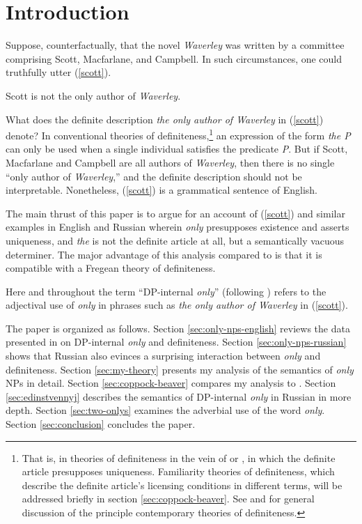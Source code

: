 \section{Introduction \label{sec:intro}}
Suppose, counterfactually, that the novel \textit{Waverley} was written by a committee comprising Scott, Macfarlane, and Campbell. In such circumstances, one could truthfully utter (\ref{scott}).

\begin{exe}
	\ex \label{scott} Scott is not the only author of \textit{Waverley}.\\
	\hspace*{\fill} \citep{cb2015}  %
\end{exe}

What does the definite description \textit{the only author of Waverley} in (\ref{scott}) denote? In conventional theories of definiteness,\footnote{That is, in theories of definiteness in the vein of \citet{frege} or \citet{strawson50}, in which the definite article presupposes uniqueness. Familiarity theories of definiteness, which describe the definite article's licensing conditions in different terms, will be addressed briefly in section \ref{sec:coppock-beaver}. See \citet[chap. 1]{schwarz09} and \citet{horn-abbott-2012} for general discussion of the principle contemporary theories of definiteness.} an expression of the form \textit{the P} can only be used when a single individual satisfies the predicate \textit{P}. But if Scott, Macfarlane and Campbell are all authors of \textit{Waverley}, then there is no single ``only author of \textit{Waverley},'' and the definite description should not be interpretable. Nonetheless, (\ref{scott}) is a grammatical sentence of English.

The main thrust of this paper is to argue for an account of (\ref{scott}) and similar examples in English and Russian wherein \textit{only} presupposes existence and asserts uniqueness, and \textit{the} is not the definite article at all, but a semantically vacuous determiner. The major advantage of this analysis compared to  is that it is compatible with a Fregean theory of definiteness.

Here and throughout the term ``DP-internal \textit{only}'' (following \citet{mcnally08}) refers to the adjectival use of \textit{only} in phrases such as \textit{the only author of Waverley} in (\ref{scott}).

The paper is organized as follows. Section \ref{sec:only-nps-english} reviews the data presented in \citet{cb2015} on DP-internal \textit{only} and definiteness. Section \ref{sec:only-nps-russian} shows that Russian also evinces a surprising interaction between \textit{only} and definiteness. Section \ref{sec:my-theory} presents my analysis of the semantics of \textit{only} NPs in detail. Section \ref{sec:coppock-beaver} compares my analysis to . Section \ref{sec:edinstvennyj} describes the semantics of DP-internal \textit{only} in Russian in more depth. Section \ref{sec:two-onlys} examines the adverbial use of the word \textit{only}. Section \ref{sec:conclusion} concludes the paper.